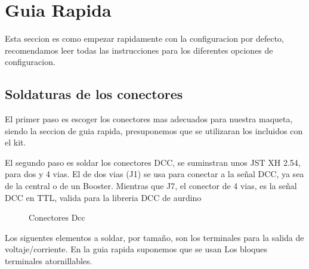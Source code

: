 \documentclass{DccDiyTools}
\begin{document}
\section{Guia Rapida}
Esta seccion es como empezar rapidamente con la configuracion por defecto, recomendamos leer todas las instrucciones para los diferentes
opciones de configuracion. 
\subsection{Soldaturas de los conectores}
El primer paso es escoger los conectores mas adecuados para nuestra maqueta, siendo la seccion de guia rapida, presuponemos que se utilizaran
los incluidos con el kit.

El segundo paso es soldar los conectores DCC, se suminstran unos JST XH 2.54, para dos y 4 vias. El de dos vias (J1) se usa para conectar a la señal DCC,
ya sea de la central o de un Booster. Mientras que J7, el conector de 4 vias, es la señal DCC
en TTL, valida para la libreria DCC de aurdino
\begin{figure}[h]
    \centering
    \caption{Conectores Dcc}
    \label{fig:DccConnectors}
\end{figure}

Los siguentes elementos a soldar, por tamaño, son los terminales para la salida de voltaje/corriente. 
En la guia rapida suponemos que se usan Los bloques terminales atornillables.
\end{document}
